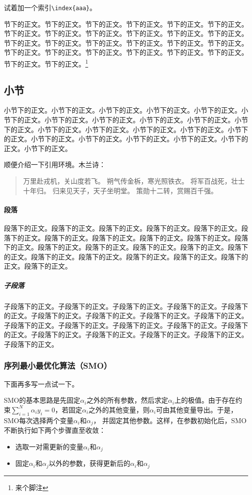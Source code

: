 \documentclass{ctexart}
\theoremstyle{plain} 		     %
\theoremstyle{definition} 		 %
\theoremstyle{remark} 			 %
\begin{document}
试着加一个索引\verb|\index{aaa}|。

节下的正文。节下的正文。节下的正文。节下的正文。节下的正文。节下的正文。节下的正文。节下的正文。节下的正文。节下的正文。节下的正文。节下的正文。节下的正文。节下的正文。节下的正文。节下的正文。节下的正文。节下的正文。节下的正文。节下的正文。节下的正文。节下的正文。节下的正文。节下的正文。节下的正文。节下的正文。\footnote{来个脚注}

\subsection{小节}
小节下的正文。小节下的正文。小节下的正文。小节下的正文。小节下的正文。小节下的正文。小节下的正文。小节下的正文。小节下的正文。小节下的正文。小节下的正文。小节下的正文。小节下的正文。小节下的正文。小节下的正文。小节下的正文。小节下的正文。小节下的正文。小节下的正文。小节下的正文。小节下的正文。小节下的正文。

顺便介绍一下引用环境。木兰诗：
\begin{quotation}
	万里赴戎机，关山度若飞。
	朔气传金柝，寒光照铁衣。
	将军百战死，壮士十年归。
	归来见天子，天子坐明堂。
	策勋十二转，赏赐百千强。
\end{quotation}

\paragraph{段落}
段落下的正文。段落下的正文。段落下的正文。段落下的正文。段落下的正文。段落下的正文。段落下的正文。段落下的正文。段落下的正文。段落下的正文。段落下的正文。段落下的正文。段落下的正文。段落下的正文。段落下的正文。段落下的正文。段落下的正文。段落下的正文。段落下的正文。段落下的正文。段落下的正文。段落下的正文。

\subparagraph{子段落}
子段落下的正文。子段落下的正文。子段落下的正文。子段落下的正文。子段落下的正文。子段落下的正文。子段落下的正文。子段落下的正文。子段落下的正文。子段落下的正文。子段落下的正文。子段落下的正文。子段落下的正文。子段落下的正文。子段落下的正文。子段落下的正文。子段落下的正文。子段落下的正文。子段落下的正文。

\subsubsection{序列最小最优化算法（SMO）}
下面再多写一点试一下。

SMO的基本思路是先固定$\alpha_{i}$之外的所有参数，然后求定$\alpha_{i}$上的极值。由于存在约束$\sum_{i=1}^N{\alpha _iy_i}=0$，若固定$\alpha_{i}$之外的其他变量，则$\alpha_{i}$可由其他变量导出。于是，SMO每次选择两个变量$\alpha_{i}$和$\alpha_{j}$， 并固定其他参数。这样，在参数初始化后，SMO不断执行如下两个步骤直至收敛：
\begin{itemize}
	\item 选取一对需更新的变量$\alpha_{i}$和$\alpha_{j}$
	\item 固定$\alpha_{i}$和$\alpha_{j}$以外的参数，获得更新后的$\alpha_{i}$和$\alpha_{j}$
\end{itemize}
\end{document}
